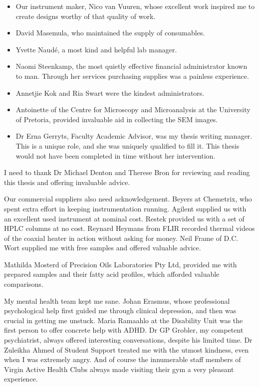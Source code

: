\documentclass[
11pt, %
english, %
singlespacing, %
headsepline, %
]{MastersDoctoralThesis} %
\begin{document}
\begin{acknowledgements}
\begin{itemize}
\item Our instrument maker, Nico van Vuuren, whose excellent work inspired me to
create designs worthy of that quality of work.

\item David Masemula, who maintained the supply of consumables.

\item Yvette Naudé, a most kind and helpful lab manager.

\item Naomi Steenkamp, the most quietly effective financial administrator known to
man. Through her services purchasing supplies was a painless experience.

\item Annetjie Kok and Ria Swart were the kindest administrators.

\item Antoinette of the Centre for Microscopy and Microanalysis at the
University of Pretoria, provided invaluable aid in collecting the SEM images.

\item Dr Erna Gerryts, Faculty Academic Advisor, was my thesis writing manager.
This is a unique role, and she was uniquely qualified to fill it. This thesis
would not have been completed in time without her intervention.

\end{itemize}

I need to thank Dr Michael Denton and Therese Bron for reviewing and reading
this thesis and offering invaluable advice.

Our commercial suppliers also need acknowledgement. Beyers at Chemetrix, who
spent extra effort in keeping instrumentation running. Agilent supplied
us with an excellent used instrument at nominal cost. Restek provided us with a
set of HPLC columns at no cost. Reynard Heymans from FLIR recorded thermal
videos of the coaxial heater in action without asking for money. Neil Frame of
D.C. Wort supplied me with free samples and offered valuable advice.

Mathilda Mosterd of Precision Oils Laboratories Pty Ltd, provided me with
prepared samples and their fatty acid profiles, which afforded valuable
comparisons.

My mental health team kept me sane. Johan Erasmus, whose professional
psychological help first guided me through clinical depression, and then was
crucial in getting me unstuck. Maria Ramaahlo at the Disability Unit was the
first person to offer concrete help with ADHD. Dr GP Grobler, my competent
psychiatrist, always offered interesting conversations, despite his limited
time. Dr Zuleikha Ahmed of Student Support treated me with the utmost kindness,
even when I was extremely angry. And of course the innumerable staff members of
Virgin Active Health Clubs always made visiting their gym a very pleasant
experience.


\end{acknowledgements}
\end{document}
